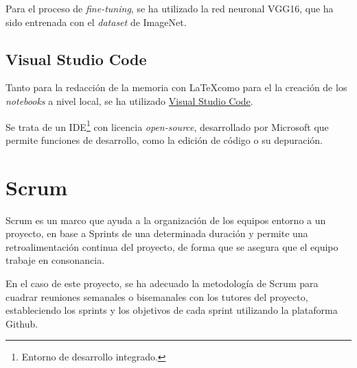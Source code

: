 Para el proceso de \textit{fine-tuning}, se ha utilizado la red neuronal VGG16, que ha sido entrenada con el \textit{dataset} de ImageNet.

\subsection{Visual Studio Code}

Tanto para la redacción de la memoria con \LaTeX como para el la creación de los \textit{notebooks} a nivel local, se ha utilizado \href{https://code.visualstudio.com/}{Visual Studio Code}.

Se trata de un IDE\footnote{Entorno de desarrollo integrado.} con licencia \textit{open-source}, desarrollado por Microsoft que permite funciones de desarrollo, como la edición de código o su depuración.

\section{Scrum}
Scrum es un marco que ayuda a la organización de los equipos entorno a un proyecto, en base a Sprints de una determinada duración y permite una retroalimentación
continua del proyecto, de forma que se asegura que el equipo trabaje en consonancia.

En el caso de este proyecto, se ha adecuado la metodología de Scrum para cuadrar reuniones semanales o bisemanales con los tutores del proyecto, estableciendo
los sprints y los objetivos de cada sprint utilizando la plataforma Github.






